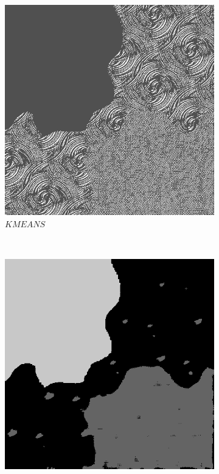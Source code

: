 \documentclass{article}
\begin{document}
\begin{enumerate}[label=(\alph*)]
        \begin{figure}[!htb]
            \centering
            \begin{subfigure}[b]{0.3\textwidth}
                \includegraphics[width=\textwidth]{img/KMEANS.png}
                \caption{$KMEANS$}
            \end{subfigure}
            ~
            \begin{subfigure}[b]{0.3\textwidth}
                \includegraphics[width=\textwidth]{img/noiseK.png}

\end{subfigure}
\end{figure}
\end{enumerate}
\end{document}
